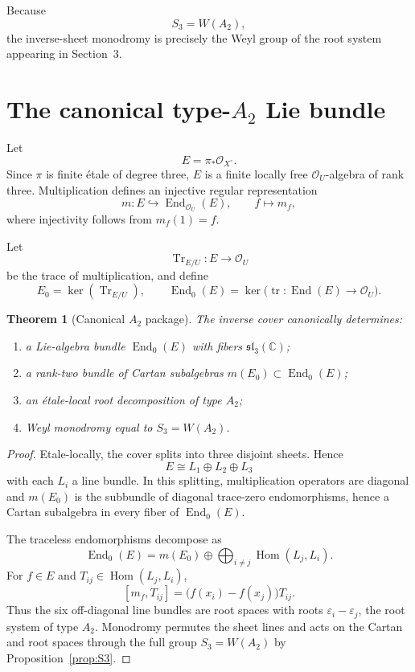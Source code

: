 \documentclass[11pt,reqno]{amsart}
\numberwithin{equation}{section}
\newtheorem{theorem}{Theorem}[section]
\theoremstyle{remark}
\newcommand{\C}{\mathbb C}
\newcommand{\OO}{\mathcal O}
\newcommand{\End}{\operatorname{End}}
\newcommand{\Tr}{\operatorname{Tr}}
\newcommand{\eps}{\varepsilon}
\begin{document}
Because
\[
S_3=W(A_2),
\]
the inverse-sheet monodromy is precisely the Weyl group of the root system appearing in Section~3.

\section{The canonical type-\texorpdfstring{$A_2$}{A2} Lie bundle}

Let
\begin{equation}\label{eq:E}
E=\pi_*\OO_{X^\circ}.
\end{equation}
Since $\pi$ is finite étale of degree three, $E$ is a finite locally free $\OO_U$-algebra of rank three. Multiplication defines an injective regular representation
\begin{equation}\label{eq:regular-rep}
m:E\hookrightarrow\End_{\OO_U}(E),
\qquad
f\longmapsto m_f,
\end{equation}
where injectivity follows from $m_f(1)=f$.

Let
\[
\Tr_{E/U}:E\to\OO_U
\]
be the trace of multiplication, and define
\[
E_0=\ker(\Tr_{E/U}),
\qquad
\End_0(E)=\ker\bigl(\operatorname{tr}:\End(E)\to\OO_U\bigr).
\]

\begin{theorem}[Canonical $A_2$ package]\label{thm:Lie-bundle}
The inverse cover canonically determines:
\begin{enumerate}[label=\textup{(\roman*)}]
\item a Lie-algebra bundle $\End_0(E)$ with fibers $\mathfrak{sl}_3(\C)$;
\item a rank-two bundle of Cartan subalgebras $m(E_0)\subset\End_0(E)$;
\item an étale-local root decomposition of type $A_2$;
\item Weyl monodromy equal to $S_3=W(A_2)$.
\end{enumerate}
\end{theorem}

\begin{proof}
Etale-locally, the cover splits into three disjoint sheets. Hence
\[
E\cong L_1\oplus L_2\oplus L_3
\]
with each $L_i$ a line bundle. In this splitting, multiplication operators are diagonal and $m(E_0)$ is the subbundle of diagonal trace-zero endomorphisms, hence a Cartan subalgebra in every fiber of $\End_0(E)$.

The traceless endomorphisms decompose as
\begin{equation}\label{eq:root-decomp}
\End_0(E)
=
m(E_0)
\oplus
\bigoplus_{i\neq j}\operatorname{Hom}(L_j,L_i).
\end{equation}
For $f\in E$ and $T_{ij}\in\operatorname{Hom}(L_j,L_i)$,
\begin{equation}\label{eq:root-action}
[m_f,T_{ij}]
=
\bigl(f(x_i)-f(x_j)\bigr)T_{ij}.
\end{equation}
Thus the six off-diagonal line bundles are root spaces with roots $\eps_i-\eps_j$, the root system of type $A_2$. Monodromy permutes the sheet lines and acts on the Cartan and root spaces through the full group $S_3=W(A_2)$ by Proposition~\ref{prop:S3}.
\end{proof}
\end{document}
